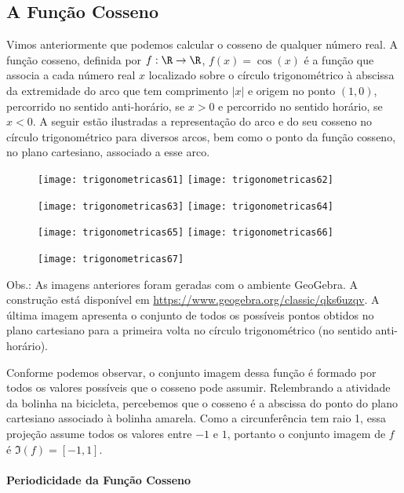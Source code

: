 \subsection{A Função Cosseno}

Vimos anteriormente que podemos calcular o cosseno de qualquer número real. A função cosseno, definida por $f:\R\to\R$, $f(x) = \cos(x)$ é a função que associa a cada número real $x$ localizado sobre o círculo trigonométrico à abscissa da extremidade do arco que tem comprimento $|x|$ e origem no ponto $(1,0)$, percorrido no sentido anti-horário, se $x>0$ e percorrido no sentido horário, se $x<0$. A seguir estão ilustradas a representação do arco e do seu cosseno no círculo trigonométrico para diversos arcos, bem como o ponto da função cosseno, no plano cartesiano, associado a esse arco.

\begin{figure}[H]
\centering

\texttt{[image: trigonometricas61]}
\texttt{[image: trigonometricas62]}

\texttt{[image: trigonometricas63]}
\texttt{[image: trigonometricas64]}

\texttt{[image: trigonometricas65]}
\texttt{[image: trigonometricas66]}

\end{figure}

\begin{figure}[H]
\centering

\texttt{[image: trigonometricas67]}
\end{figure}

Obs.: As imagens anteriores foram geradas com o ambiente GeoGebra. A construção está disponível em \url{https://www.geogebra.org/classic/qks6uzqv}. A última imagem apresenta o conjunto de todos os possíveis pontos obtidos no plano cartesiano para a primeira volta no círculo trigonométrico (no sentido anti-horário).

Conforme podemos observar, o conjunto imagem dessa função é formado por todos os valores possíveis que o cosseno pode assumir. Relembrando a atividade da bolinha na bicicleta, percebemos que o cosseno é a abscissa do ponto do plano cartesiano associado à bolinha amarela. Como a circunferência tem raio 1, essa projeção assume todos os valores entre $-1$ e $1$, portanto o conjunto imagem de $f$ é $\Im(f)=[-1,1]$.

\paragraph{Periodicidade da Função Cosseno}

